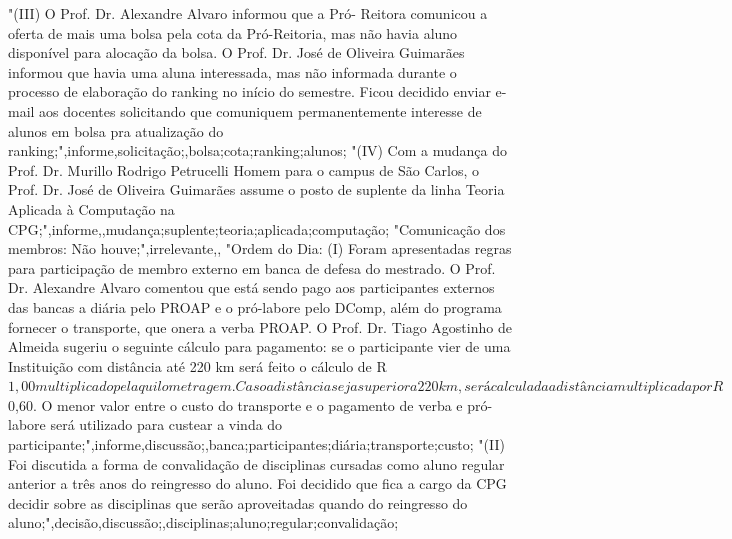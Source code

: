 "(III) O Prof. Dr. Alexandre Alvaro informou que a Pró- Reitora comunicou a oferta de mais uma bolsa pela cota da Pró-Reitoria, mas não havia aluno disponível para alocação da bolsa.
O Prof. Dr. José de Oliveira Guimarães informou que havia uma aluna interessada, mas não informada durante o processo de elaboração do ranking no início do semestre.
Ficou decidido enviar e-mail aos docentes solicitando que comuniquem permanentemente interesse de alunos em bolsa pra atualização do ranking;",informe,solicitação;,bolsa;cota;ranking;alunos;
"(IV) Com a mudança do Prof. Dr. Murillo Rodrigo Petrucelli Homem para o campus de São Carlos, o Prof. Dr. José de Oliveira Guimarães assume o posto de suplente da linha Teoria Aplicada à Computação na CPG;",informe,,mudança;suplente;teoria;aplicada;computação;
"Comunicação dos membros: Não houve;",irrelevante,,
"Ordem do Dia: (I) Foram apresentadas regras para participação de membro externo em banca de defesa do mestrado.
O Prof. Dr. Alexandre Alvaro comentou que está sendo pago aos participantes externos das bancas a diária pelo PROAP e o pró-labore pelo DComp, além do programa fornecer o transporte, que onera a verba PROAP.
O Prof. Dr. Tiago Agostinho de Almeida sugeriu o seguinte cálculo para pagamento: se o participante vier de uma Instituição com distância até 220 km será feito o cálculo de R$ 1,00 multiplicado pela quilometragem.
Caso a distância seja superior a 220 km, será calculada a distância multiplicada por R$ 0,60. O menor valor entre o custo do transporte e o pagamento de verba e pró-labore será utilizado para custear a vinda do participante;",informe,discussão;,banca;participantes;diária;transporte;custo;
"(II) Foi discutida a forma de convalidação de disciplinas cursadas como aluno regular anterior a três anos do reingresso do aluno.
Foi decidido que fica a cargo da CPG decidir sobre as disciplinas que serão aproveitadas quando do reingresso do aluno;",decisão,discussão;,disciplinas;aluno;regular;convalidação;

































